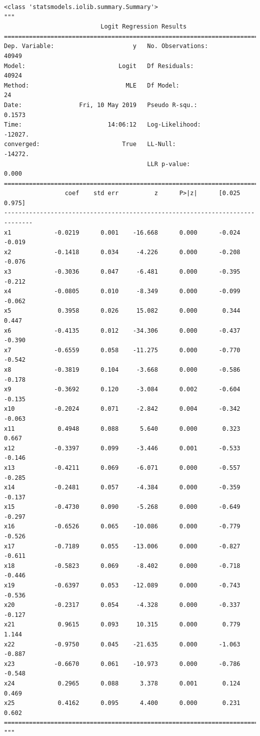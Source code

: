 \documentclass[8pt,onecolumn,aps,pra]{revtex4-1}
\begin{document}
    
    \begin{verbatim}
<class 'statsmodels.iolib.summary.Summary'>
"""
                           Logit Regression Results                           
==============================================================================
Dep. Variable:                      y   No. Observations:                40949
Model:                          Logit   Df Residuals:                    40924
Method:                           MLE   Df Model:                           24
Date:                Fri, 10 May 2019   Pseudo R-squ.:                  0.1573
Time:                        14:06:12   Log-Likelihood:                -12027.
converged:                       True   LL-Null:                       -14272.
                                        LLR p-value:                     0.000
==============================================================================
                 coef    std err          z      P>|z|      [0.025      0.975]
------------------------------------------------------------------------------
x1            -0.0219      0.001    -16.668      0.000      -0.024      -0.019
x2            -0.1418      0.034     -4.226      0.000      -0.208      -0.076
x3            -0.3036      0.047     -6.481      0.000      -0.395      -0.212
x4            -0.0805      0.010     -8.349      0.000      -0.099      -0.062
x5             0.3958      0.026     15.082      0.000       0.344       0.447
x6            -0.4135      0.012    -34.306      0.000      -0.437      -0.390
x7            -0.6559      0.058    -11.275      0.000      -0.770      -0.542
x8            -0.3819      0.104     -3.668      0.000      -0.586      -0.178
x9            -0.3692      0.120     -3.084      0.002      -0.604      -0.135
x10           -0.2024      0.071     -2.842      0.004      -0.342      -0.063
x11            0.4948      0.088      5.640      0.000       0.323       0.667
x12           -0.3397      0.099     -3.446      0.001      -0.533      -0.146
x13           -0.4211      0.069     -6.071      0.000      -0.557      -0.285
x14           -0.2481      0.057     -4.384      0.000      -0.359      -0.137
x15           -0.4730      0.090     -5.268      0.000      -0.649      -0.297
x16           -0.6526      0.065    -10.086      0.000      -0.779      -0.526
x17           -0.7189      0.055    -13.006      0.000      -0.827      -0.611
x18           -0.5823      0.069     -8.402      0.000      -0.718      -0.446
x19           -0.6397      0.053    -12.089      0.000      -0.743      -0.536
x20           -0.2317      0.054     -4.328      0.000      -0.337      -0.127
x21            0.9615      0.093     10.315      0.000       0.779       1.144
x22           -0.9750      0.045    -21.635      0.000      -1.063      -0.887
x23           -0.6670      0.061    -10.973      0.000      -0.786      -0.548
x24            0.2965      0.088      3.378      0.001       0.124       0.469
x25            0.4162      0.095      4.400      0.000       0.231       0.602
==============================================================================
"""
    \end{verbatim}
\end{document}
